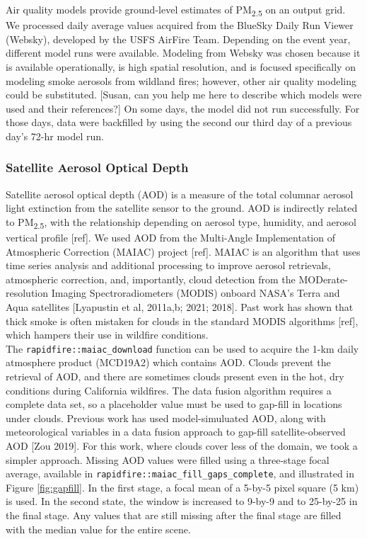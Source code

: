 \documentclass[gmd, manuscript]{copernicus}
\begin{document}
Air quality models provide ground-level estimates of
PM\textsubscript{2.5} on an output grid. We processed daily average
values acquired from the BlueSky Daily Run Viewer (Websky), developed by
the USFS AirFire Team. Depending on the event year, different model runs
were available. Modeling from Websky was chosen because it is available
operationally, is high spatial resolution, and is focused specifically
on modeling smoke aerosols from wildland fires; however, other air
quality modeling could be substituted. {[}Susan, can you help me here to
describe which models were used and their references?{]} On some days,
the model did not run successfully. For those days, data were backfilled
by using the second our third day of a previous day's 72-hr model run.

\subsubsection{Satellite Aerosol Optical Depth}

Satellite aerosol optical depth (AOD) is a measure of the total columnar
aerosol light extinction from the satellite sensor to the ground. AOD is
indirectly related to PM\textsubscript{2.5}, with the relationship
depending on aerosol type, humidity, and aerosol vertical profile
{[}ref{]}. We used AOD from the Multi-Angle Implementation of
Atmospheric Correction (MAIAC) project {[}ref{]}. MAIAC is an algorithm
that uses time series analysis and additional processing to improve
aerosol retrievals, atmospheric correction, and, importantly, cloud
detection from the MODerate-resolution Imaging Spectroradiometers
(MODIS) onboard NASA's Terra and Aqua satellites {[}Lyapustin et al,
2011a,b; 2021; 2018{]}. Past work has shown that thick smoke is often
mistaken for clouds in the standard MODIS algorithms {[}ref{]}, which
hampers their use in wildfire conditions.\\
The \texttt{rapidfire::maiac\_download} function can be used to acquire
the 1-km daily atmosphere product (MCD19A2) which contains AOD. Clouds
prevent the retrieval of AOD, and there are sometimes clouds present
even in the hot, dry conditions during California wildfires. The data
fusion algorithm requires a complete data set, so a placeholder value
must be used to gap-fill in locations under clouds. Previous work has
used model-simuluated AOD, along with meteorological variables in a data
fusion approach to gap-fill satellite-observed AOD {[}Zou 2019{]}. For
this work, where clouds cover less of the domain, we took a simpler
approach. Missing AOD values were filled using a three-stage focal
average, available in \texttt{rapidfire::maiac\_fill\_gaps\_complete},
and illustrated in Figure \ref{fig:gapfill}. In the first stage, a focal
mean of a 5-by-5 pixel square (5 km) is used. In the second state, the
window is increased to 9-by-9 and to 25-by-25 in the final stage. Any
values that are still missing after the final stage are filled with the
median value for the entire scene.
\end{document}

